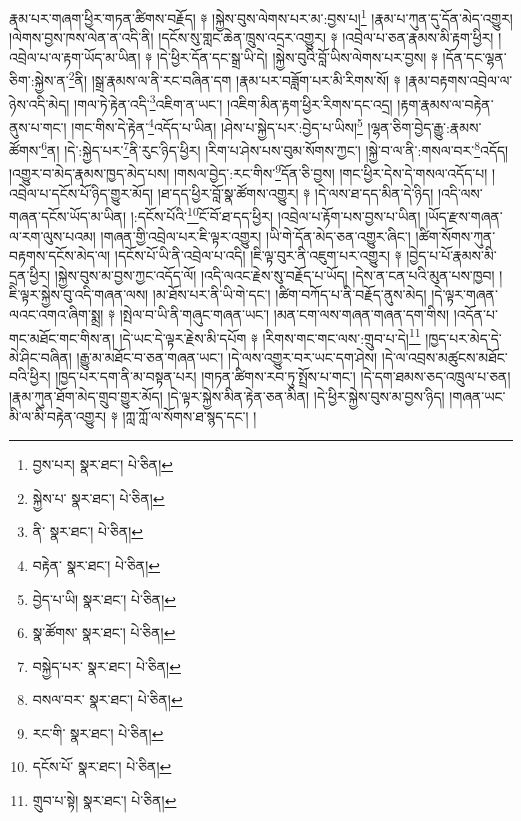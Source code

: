 རྣམ་པར་གཞག་ཕྱིར་གཏན་ཚིགས་བརྗོད། ༈ །སྐྱེས་བུས་ལེགས་པར་མ་:བྱས་པ།\footnote{བྱས་པར།  སྣར་ཐང་།  པེ་ཅིན། } །རྣམ་པ་ཀུན་དུ་དོན་མེད་འགྱུར། །ལེགས་བྱས་ཁས་ལེན་ན་འདི་ནི། །དངོས་སུ་གླང་ཆེན་ཁྲུས་འདྲར་འགྱུར། ༈ །འབྲེལ་པ་ཅན་རྣམས་མི་རྟག་ཕྱིར། །འབྲེལ་པ་ལ་རྟག་ཡོད་མ་ཡིན། ༈ །དེ་ཕྱིར་དོན་དང་སྒྲ་ཡི་དེ། །སྐྱེས་བུའི་བློ་ཡིས་ལེགས་པར་བྱས། ༈ །དོན་དང་ལྷན་ཅིག་:སྐྱེས་ན་\footnote{སྐྱེས་པ་  སྣར་ཐང་།  པེ་ཅིན། }ནི། །སྒྲ་རྣམས་ལ་ནི་རང་བཞིན་དག །རྣམ་པར་བཟློག་པར་མི་རིགས་སོ། ༈ །རྣམ་བརྟགས་འབྲེལ་ལ་ཉེས་འདི་མེད། །གལ་ཏེ་རྟེན་འདི་\footnote{ནི་  སྣར་ཐང་།  པེ་ཅིན། }འཇིག་ན་ཡང་། །འཇིག་མིན་རྟག་ཕྱིར་རིགས་དང་འདྲ། །རྟག་རྣམས་ལ་བརྟེན་ནུས་པ་གང་། །གང་གིས་དེ་རྟེན་\footnote{བརྟེན་  སྣར་ཐང་།  པེ་ཅིན། }འདོད་པ་ཡིན། །ཤེས་པ་སྐྱེད་པར་:བྱེད་པ་ཡིས།\footnote{བྱེད་པ་ཡི།  སྣར་ཐང་།  པེ་ཅིན། } །ལྷན་ཅིག་བྱེད་རྒྱུ་:རྣམས་ཚོགས་\footnote{སྣ་ཚོགས་  སྣར་ཐང་།  པེ་ཅིན། }ན། །དེ་:སྐྱེད་པར་\footnote{བསྐྱེད་པར་  སྣར་ཐང་།  པེ་ཅིན། }ནི་རུང་ཉིད་ཕྱིར། །རིག་པ་ཤེས་པས་བུམ་སོགས་ཀྱང་། །སྐྱེ་བ་ལ་ནི་:གསལ་བར་\footnote{བསལ་བར་  སྣར་ཐང་།  པེ་ཅིན། }འདོད། །འགྱུར་བ་མེད་རྣམས་ཁྱད་མེད་པས། །གསལ་བྱེད་:རང་གིས་\footnote{རང་གི་  སྣར་ཐང་།  པེ་ཅིན། }དོན་ཅི་བྱས། །གང་ཕྱིར་དེས་དེ་གསལ་འདོད་པ། །འབྲེལ་པ་དངོས་པོ་ཉིད་གྱུར་མོད། །ཐ་དད་ཕྱིར་བློ་སྣ་ཚོགས་འགྱུར། ༈ །དེ་ལས་ཐ་དད་མིན་དེ་ཉིད། །འདི་ལས་གཞན་དངོས་ཡོད་མ་ཡིན། །:དངོས་པོའི་\footnote{དངོས་པོ་  སྣར་ཐང་།  པེ་ཅིན། }ངོ་བོ་ཐ་དད་ཕྱིར། །འབྲེལ་པ་རྟོག་པས་བྱས་པ་ཡིན། །ཡོད་རྫས་གཞན་ལ་རག་ལུས་པའམ། །གཞན་གྱི་འབྲེལ་པར་ཇི་ལྟར་འགྱུར། །ཡི་གེ་དོན་མེད་ཅན་འགྱུར་ཞིང་། །ཚིག་སོགས་ཀུན་བརྟགས་དངོས་མེད་ལ། །དངོས་པོ་ཡི་ནི་འབྲེལ་པ་འདི། །ཇི་ལྟ་བུར་ནི་འཇུག་པར་འགྱུར། ༈ །བྱེད་པ་པོ་རྣམས་མི་དྲན་ཕྱིར། །སྐྱེས་བུས་མ་བྱས་ཀྱང་འདོད་ལོ། །འདི་ལའང་རྗེས་སུ་བརྗོད་པ་ཡོད། །དེས་ན་ངན་པའི་མུན་པས་ཁྱབ། །ཇི་ལྟར་སྐྱེས་བུ་འདི་གཞན་ལས། །མ་ཐོས་པར་ནི་ཡི་གེ་དང་། །ཚིག་བཀོད་པ་ནི་བརྗོད་ནུས་མེད། །དེ་ལྟར་གཞན་ལའང་འགའ་ཞིག་སྨྲ། ༈ །སྤེལ་བ་ཡི་ནི་གཞུང་གཞན་ཡང་། །མན་ངག་ལས་གཞན་གཞན་དག་གིས། །འདོན་པ་གང་མཐོང་གང་གིས་ན། །དེ་ཡང་དེ་ལྟར་རྗེས་མི་དཔོག ༈ །རིགས་གང་གང་ལས་:གྲུབ་པ་དེ།\footnote{གྲུབ་པ་སྟེ།  སྣར་ཐང་།  པེ་ཅིན། } །ཁྱད་པར་མེད་དེ་མེ་ཤིང་བཞིན། །རྒྱུ་མ་མཐོང་བ་ཅན་གཞན་ཡང་། །དེ་ལས་འགྱུར་བར་ཡང་དག་ཤེས། །དེ་ལ་འབྲས་མཚུངས་མཐོང་བའི་ཕྱིར། །ཁྱད་པར་དག་ནི་མ་བསྟན་པར། །གཏན་ཚིགས་རབ་ཏུ་སྤྲོས་པ་གང་། །དེ་དག་ཐམས་ཅད་འཁྲུལ་པ་ཅན། །རྣམ་ཀུན་ཐོག་མེད་གྲུབ་གྱུར་མོད། །དེ་ལྟར་སྐྱེས་མིན་རྟེན་ཅན་མིན། །དེ་ཕྱིར་སྐྱེས་བུས་མ་བྱས་ཉིད། །གཞན་ཡང་མི་ལ་མི་བརྟེན་འགྱུར། ༈ །ཀླ་ཀློ་ལ་སོགས་ཐ་སྙད་དང་། །
